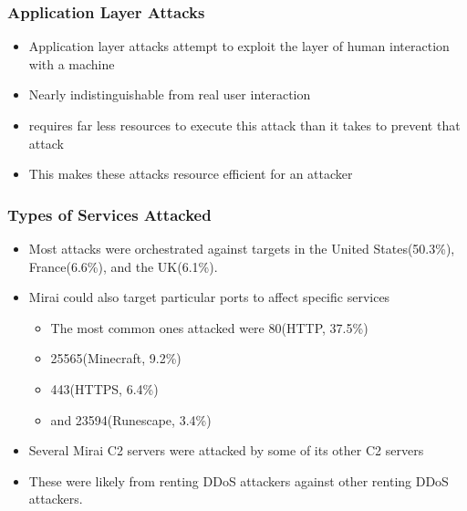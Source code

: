 \documentclass{beamer}
\begin{document}
\begin{frame}
    \frametitle{Application Layer Attacks}
        \begin{itemize}
            \item Application layer attacks attempt to exploit the layer of human interaction with a machine
            \item Nearly indistinguishable from real user interaction
            \item requires far less resources to execute this attack than it takes to prevent that attack
            \item This makes these attacks resource efficient for an attacker
    \end{itemize}
\end{frame}

\begin{frame}
    \frametitle{Types of Services Attacked}
    \begin{itemize}
        \item Most attacks were orchestrated against targets in the United States(50.3\%), France(6.6\%), and the UK(6.1\%).
        \item Mirai could also target particular ports to affect specific services
        \begin{itemize}
        		\item The most common ones attacked were 80(HTTP, 37.5\%)
        		\item 25565(Minecraft, 9.2\%)
        		\item 443(HTTPS, 6.4\%)
        		\item and 23594(Runescape, 3.4\%)
        \end{itemize}
        \item Several Mirai C2 servers were attacked by some of its other C2 servers
        \item These were likely from renting DDoS attackers against other renting DDoS attackers.
    \end{itemize}
\end{frame}
\end{document}
